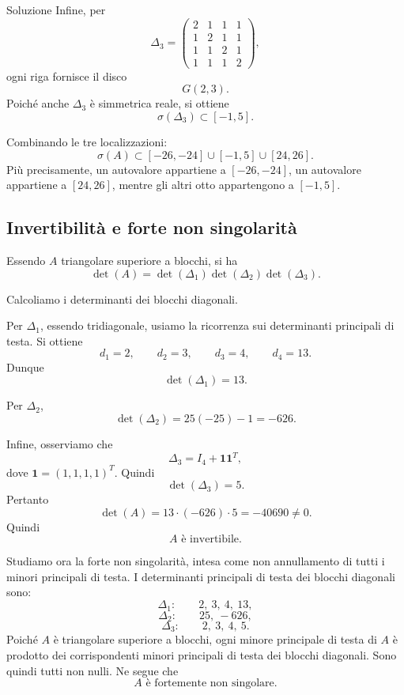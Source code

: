 \documentclass[a4paper]{article}
\begin{document}
\begin{snippetsolution}{Soluzione}
    Infine, per
    \[
        \Delta_3=
        \begin{pmatrix}
            2 & 1 & 1 & 1\\
            1 & 2 & 1 & 1\\
            1 & 1 & 2 & 1\\
            1 & 1 & 1 & 2
        \end{pmatrix},
    \]
    ogni riga fornisce il disco
    \[
        G(2,3).
    \]
    Poiché anche \(\Delta_3\) è simmetrica reale, si ottiene
    \[
        \sigma(\Delta_3)\subset [-1,5].
    \]

    Combinando le tre localizzazioni:
    \[
        \sigma(A)\subset [-26,-24]\cup[-1,5]\cup[24,26].
    \]
    Più precisamente, un autovalore appartiene a \([-26,-24]\), un autovalore appartiene a \([24,26]\), mentre gli altri otto appartengono a \([-1,5]\).

    \subsection*{Invertibilità e forte non singolarità}

    Essendo \(A\) triangolare superiore a blocchi, si ha
    \[
        \det(A)=\det(\Delta_1)\det(\Delta_2)\det(\Delta_3).
    \]

    Calcoliamo i determinanti dei blocchi diagonali.

    Per \(\Delta_1\), essendo tridiagonale, usiamo la ricorrenza sui determinanti principali di testa. Si ottiene
    \[
        d_1=2,\qquad d_2=3,\qquad d_3=4,\qquad d_4=13.
    \]
    Dunque
    \[
        \det(\Delta_1)=13.
    \]

    Per \(\Delta_2\),
    \[
        \det(\Delta_2)=25(-25)-1=-626.
    \]

    Infine, osserviamo che
    \[
        \Delta_3=I_4+\mathbf{1}\mathbf{1}^T,
    \]
    dove \(\mathbf{1}=(1,1,1,1)^T\). Quindi
    \[
        \det(\Delta_3)=5.
    \]
    Pertanto
    \[
        \det(A)=13\cdot(-626)\cdot 5=-40690\neq 0.
    \]
    Quindi
    \[
        A \text{ è invertibile.}
    \]

    Studiamo ora la forte non singolarità, intesa come non annullamento di tutti i minori principali di testa. I determinanti principali di testa dei blocchi diagonali sono:
    \[
        \Delta_1:\qquad 2,\ 3,\ 4,\ 13,
    \]
    \[
        \Delta_2:\qquad 25,\ -626,
    \]
    \[
        \Delta_3:\qquad 2,\ 3,\ 4,\ 5.
    \]
    Poiché \(A\) è triangolare superiore a blocchi, ogni minore principale di testa di \(A\) è prodotto dei corrispondenti minori principali di testa dei blocchi diagonali. Sono quindi tutti non nulli. Ne segue che
    \[
        A \text{ è fortemente non singolare.}
    \]


\end{snippetsolution}
\end{document}
